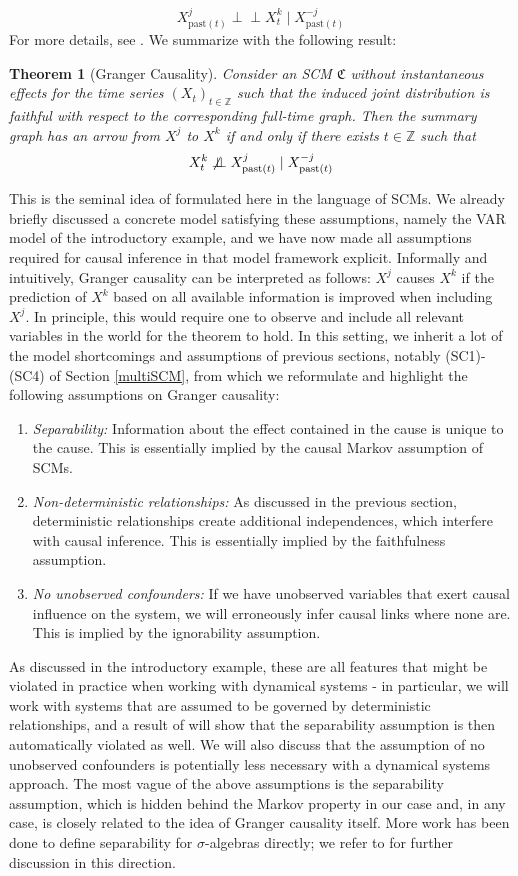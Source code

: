 \documentclass[11pt, a4paper]{memoir}
\theoremstyle{break}
\newtheorem{thm}{Theorem}
\theoremstyle{break}
\theoremstyle{nonumberplain}
\newcommand{\mZ}{\mathbb{Z}}
\newcommand{\indep}{\perp \!\!\! \perp}
\begin{document}
$$X^j_{\text{past}(t)}\indep X_t^k\mid X^{-j}_{\text{past}(t)}$$
For more details, see \cite{Peters}. We summarize with the following result:
\begin{thm}[Granger Causality]
Consider an SCM $\mathfrak{C}$ without instantaneous effects for the time series $(X_t)_{t\in \mZ}$ such that the induced joint distribution is faithful with respect to the corresponding full-time graph. Then the summary graph has an arrow from $X^j$ to $X^k$ if and only if there exists $t\in \mZ$ such that
$$X^k_t\centernot\indep X_{\text{past}(t)}^j\mid X^{-j}_{\text{past}(t)}$$
\end{thm}
This is the seminal idea of \cite{Granger} formulated here in the language of SCMs. We already briefly discussed a concrete model satisfying these assumptions, namely the VAR model of the introductory example, and we have now made all assumptions required for causal inference in that model framework explicit. Informally and intuitively, Granger causality can be interpreted as follows: $X^j$ causes $X^k$ if the prediction of $X^k$ based on all available information is improved when including $X^j$. In principle, this would require one to observe and include all relevant variables in the world for the theorem to hold. In this setting, we inherit a lot of the model shortcomings and assumptions of previous sections, notably (SC1)-(SC4) of Section \ref{multiSCM}, from which we reformulate and highlight the following assumptions on Granger causality:
\begin{enumerate}[itemindent=15pt,label=(GC\arabic*)]
	\item \emph{Separability:} Information about the effect contained in the cause is unique to the cause. This is essentially implied by the causal Markov assumption of SCMs.
	\item \emph{Non-deterministic relationships:} As discussed in the previous section, deterministic relationships create additional independences, which interfere with causal inference. This is essentially implied by the faithfulness assumption.
	\item \emph{No unobserved confounders:} If we have unobserved variables that exert causal influence on the system, we will erroneously infer causal links where none are. This is implied by the ignorability assumption.
\end{enumerate}
As discussed in the introductory example, these are all features that might be violated in practice when working with dynamical systems - in particular, we will work with systems that are assumed to be governed by deterministic relationships, and a result of \cite{Takens} will show that the separability assumption is then automatically violated as well. We will also discuss that the assumption of no unobserved confounders is potentially less necessary with a dynamical systems approach. The most vague of the above assumptions is the separability assumption, which is hidden behind the Markov property in our case and, in any case, is closely related to the idea of Granger causality itself. More work has been done to define separability for $\sigma$-algebras directly; we refer to \cite{Sepa} for further discussion in this direction.\\\\
\end{document}
